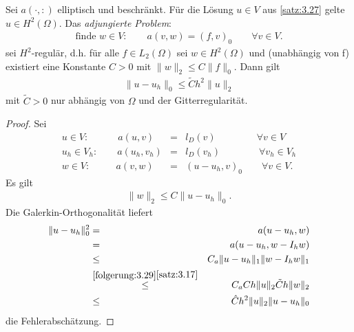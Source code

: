 \begin{Satz}
    \label{satz:3.31}
    Sei $a(\cdot, :)$ elliptisch und beschränkt. Für die Lösung $u\in
    V$ aus \eqref{satz:3.27} gelte $u\in H^2(\Omega)$. Das \emph{adjungierte
    Problem}:
    \begin{eqnarray*}
        \text{finde } w\in V: \qquad a(v, w) = (f, v)_0 \qquad \forall v\in V.
    \end{eqnarray*}
    sei $H^2$-regulär, d.h. für alle $f\in L_2(\Omega)$ sei $w\in
    H^2(\Omega)$ und (unabhängig von f) existiert eine Konstante $C > 0$ mit
    $\|w\|_2 \le C \|f\|_0$.
    Dann gilt
    \begin{eqnarray*}
        \|u - u_h\|_0 \le \tilde C h^2 \|u\|_2
    \end{eqnarray*}
    mit $\tilde C > 0$ nur abhängig von $\Omega$ und der Gitterregularität.
\end{Satz}


\begin{proof}
    Sei
    \begin{eqnarray*}
        u\in V: \quad \qquad a(u, v) &=& l_D(v) \qquad \qquad \ \forall v\in V
        \\
        u_h\in V_h: \qquad a(u_h, v_h) &=& l_D(v_h) \qquad \qquad \forall
                    v_h\in V_h \\
        w\in V: \ \ \ \qquad a(v, w) &=& (u - u_h, v)_0 \qquad \forall v\in V.
    \end{eqnarray*}
    Es gilt
    \begin{eqnarray*}
        \|w\|_2 \le C \|u - u_h\|_0.
    \end{eqnarray*}
    Die Galerkin-Orthogonalität liefert
    \begin{eqnarray*}
            \|u - u_h\|_0^2
        &=& a(u - u_h, w) \\
        &=& a(u - u_h, w - I_h w) \\
        &\le& C_a \|u - u_h\|_1 \|w - I_h w\|_1 \\
        &\stackrel{\substack{\eqref{folgerung:3.29}}{\eqref{satz:3.17}}}{\le}&
              C_a C h \|u\|_2 \tilde C h \|w\|_2 \\
        &\le& \hat C h^2 \|u\|_2 \|u - u_h\|_0
    \end{eqnarray*}
    die Fehlerabschätzung.
\end{proof}